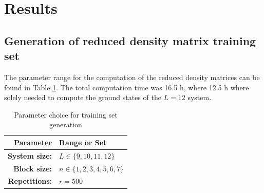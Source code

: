 \documentclass[reprint,amsmath,amssymb,aps,prb]{revtex4-2}
\begin{document}
\section{Results}

\subsection{Generation of reduced density matrix training set}

The parameter range for the computation of the reduced density matrices can be found in Table \ref{tab:par_train}. The total computation time was 16.5 h, where 12.5 h where solely needed to compute the ground states of the $L=12$ system.

\begin{table}[h!]
	\centering
	\begin{tabular}{rl}
		\hline
		Parameter & Range or Set \\
		\hline
		\hline 
	\textbf{System size:} & $L \in \{9, 10, 11, 12\}$ \\ 
		\textbf{Block size:} & $n \in \{1, 2, 3, 4, 5, 6, 7\}$ \\ 
		\textbf{Repetitions:} & $r=500$\\
		\hline
	\end{tabular} 
	\caption{Parameter choice for training set generation}\label{tab:par_train}
\end{table}
\end{document}
